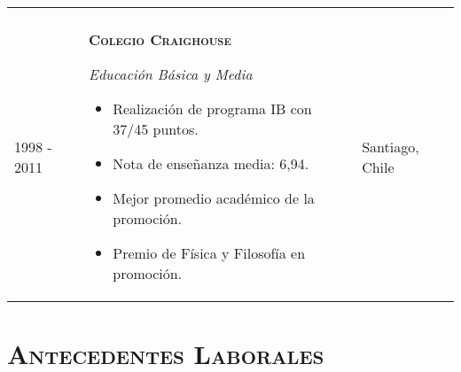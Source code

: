 \documentclass[a4paper,10pt]{article}
\begin{document}
\begin{tabular}{p{2 cm}|p{11cm}|p{2cm}}
&\\

1998 - 2011 &
\textbf{\textsc{Colegio Craighouse}}

\textit{Educación Básica y Media}
\begin{itemize}
	\item Realización de programa IB con 37/45 puntos.
	\item Nota de enseñanza media: 6,94.
	\item Mejor promedio académico de la promoción.
	\item Premio de Física y Filosofía en promoción.
\end{itemize}

&
Santiago, Chile
\end{tabular}

\bigskip
\section*{\textsc{Antecedentes Laborales}}
\end{document}
